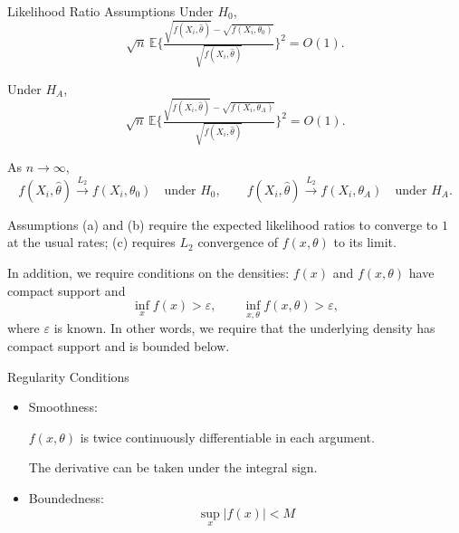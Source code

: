\begin{frame}{Likelihood Ratio Assumptions}
Under $H_0$,
\begin{equation}
\sqrt{n}\,\mathbb{E}\{\tfrac{\sqrt{f(X_i,\hat\theta)} - \sqrt{f(X_i,\theta_0)}}{\sqrt{f(X_i,\hat\theta)}} \}^2 = O(1).
\tag{a}
\end{equation}

Under $H_A$,
\begin{equation}
\sqrt{n}\,\mathbb{E}\{\tfrac{\sqrt{f(X_i,\hat\theta)} - \sqrt{f(X_i,\theta_A)}}{\sqrt{f(X_i,\hat\theta)}} \}^2 = O(1).
\tag{b}
\end{equation}

As $n \to \infty$,
\begin{equation}
f(X_i,\hat\theta) \xrightarrow{L_2} f(X_i,\theta_0) \quad \text{under } H_0, 
\qquad 
f(X_i,\hat\theta) \xrightarrow{L_2} f(X_i,\theta_A) \quad \text{under } H_A.
\tag{c}
\end{equation}

Assumptions (a) and (b) require the expected likelihood ratios to converge to $1$ at the usual rates; (c) requires $L_2$ convergence of $f(x,\theta)$ to its limit.

In addition, we require conditions on the densities: $f(x)$ and $f(x,\theta)$ have compact support and
\[
\inf_x f(x) > \varepsilon, 
\qquad 
\inf_{x,\theta} f(x,\theta) > \varepsilon,
\]
where $\varepsilon$ is known. In other words, we require that the underlying density has compact support and is bounded below.
\end{frame}


\begin{frame}{Regularity Conditions }
\begin{itemize}
    \item Smoothness:
    
    $f(x,\theta)$ is twice continuously differentiable in each argument. 
    
    The derivative can be taken under the integral sign.


    \item Boundedness:
    \[
    \sup_x |f(x)| < M
    \]

    \end{itemize}
\end{frame}


